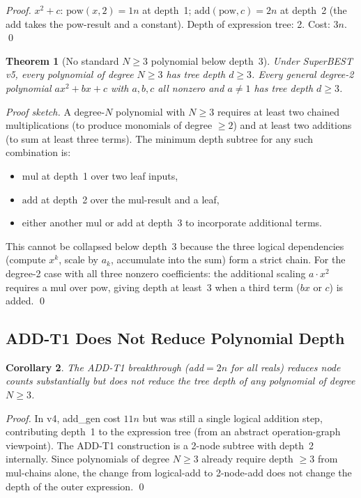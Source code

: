 \documentclass[11pt,a4paper]{article}
\newtheorem{theorem}{Theorem}[section]
\newtheorem{corollary}[theorem]{Corollary}
\begin{document}
\begin{proof}
  $x^2 + c$: $\mathrm{pow}(x, 2) = 1n$ at depth~1; $\mathrm{add}(\mathrm{pow}, c) = 2n$
  at depth~2 (the add takes the pow-result and a constant). Depth of expression tree: 2.
  Cost: $3n$. \qed
\end{proof}

\begin{theorem}[No standard $N \geq 3$ polynomial below depth~3]
\label{thm:depth3}
  Under SuperBEST v5, every polynomial of degree $N \geq 3$ has tree depth $d \geq 3$.
  Every general degree-2 polynomial $ax^2 + bx + c$ with $a, b, c$ all nonzero and $a \neq 1$
  has tree depth $d \geq 3$.
\end{theorem}

\begin{proof}[Proof sketch]
  A degree-$N$ polynomial with $N \geq 3$ requires at least two chained multiplications
  (to produce monomials of degree $\geq 2$) and at least two additions (to sum at least
  three terms). The minimum depth subtree for any such combination is:
  \begin{itemize}
    \item $\mathrm{mul}$ at depth~1 over two leaf inputs,
    \item $\mathrm{add}$ at depth~2 over the mul-result and a leaf,
    \item either another $\mathrm{mul}$ or $\mathrm{add}$ at depth~3 to incorporate
          additional terms.
  \end{itemize}
  This cannot be collapsed below depth~3 because the three logical dependencies
  (compute $x^k$, scale by $a_k$, accumulate into the sum) form a strict chain.
  For the degree-2 case with all three nonzero coefficients: the additional scaling
  $a \cdot x^2$ requires a mul over pow, giving depth at least~3 when a third term
  ($bx$ or $c$) is added. \qed
\end{proof}

\subsection{ADD-T1 Does Not Reduce Polynomial Depth}

\begin{corollary}
  The ADD-T1 breakthrough (add$= 2n$ for all reals) reduces \emph{node counts}
  substantially but does \emph{not} reduce the tree depth of any polynomial of degree $N \geq 3$.
\end{corollary}

\begin{proof}
  In v4, add\_gen cost $11n$ but was still a single logical addition step, contributing
  depth~1 to the expression tree (from an abstract operation-graph viewpoint). The
  ADD-T1 construction is a 2-node subtree with depth~2 internally. Since polynomials
  of degree $N \geq 3$ already require depth $\geq 3$ from mul-chains alone, the
  change from logical-add to 2-node-add does not change the depth of the outer expression.
  \qed
\end{proof}
\end{document}
